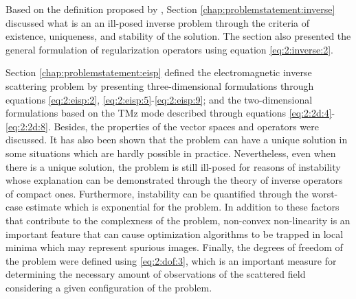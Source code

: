 		Based on the definition proposed by \cite{hadamard1923lectures}, Section \ref{chap:problemstatement:inverse} discussed what is an an ill-posed inverse problem through the criteria of existence, uniqueness, and stability of the solution. The section also presented the general formulation of regularization operators using equation \eqref{eq:2:inverse:2}.
		
		Section \ref{chap:problemstatement:eisp} defined the electromagnetic inverse scattering problem by presenting three-dimensional formulations through equations \eqref{eq:2:eisp:2}, \eqref{eq:2:eisp:5}-\eqref{eq:2:eisp:9}; and the two-dimensional formulations based on the TMz mode described through equations \eqref{eq:2:2d:4}-\eqref{eq:2:2d:8}. Besides, the properties of the vector spaces and operators were discussed. It has also been shown that the problem can have a unique solution in some situations which are hardly possible in practice. Nevertheless, even when there is a unique solution, the problem is still ill-posed for reasons of instability whose explanation can be demonstrated through the theory of inverse operators of compact ones. Furthermore, instability can be quantified through the worst-case estimate which is exponential for the problem. In addition to these factors that contribute to the complexness of the problem, non-convex non-linearity is an important feature that can cause optimization algorithms to be trapped in local minima which may represent spurious images. Finally, the degrees of freedom of the problem were defined using \eqref{eq:2:dof:3}, which is an important measure for determining the necessary amount of observations of the scattered field considering a given configuration of the problem.
		